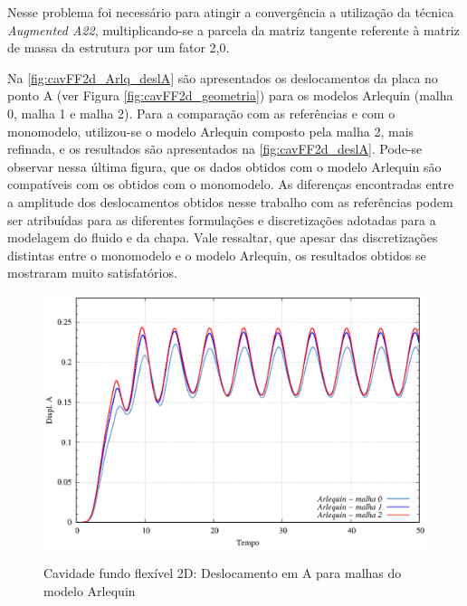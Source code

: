 Nesse problema foi necessário para atingir a convergência a utilização da técnica \textit{Augmented A22}, multiplicando-se a parcela da matriz tangente referente à matriz de massa da estrutura por um fator 2,0.

Na \autoref{fig:cavFF2d_Arlq_deslA} são apresentados os deslocamentos da placa no ponto A (ver Figura \ref{fig:cavFF2d_geometria}) para os modelos Arlequin (malha 0, malha 1 e malha 2). Para a comparação com as referências e com o monomodelo, utilizou-se o modelo Arlequin composto pela malha 2, mais refinada, e os resultados são apresentados na \autoref{fig:cavFF2d_deslA}. Pode-se observar nessa última figura, que os dados obtidos com o modelo Arlequin são compatíveis com os obtidos com o monomodelo. As diferenças encontradas entre a amplitude dos deslocamentos obtidos nesse trabalho com as referências podem ser atribuídas para as diferentes formulações e discretizações adotadas para a modelagem do fluido e da chapa. Vale ressaltar, que apesar das discretizações distintas entre o monomodelo e o modelo Arlequin, os resultados obtidos se mostraram muito satisfatórios.

\begin{figure}[!htbp]
	\caption{Cavidade fundo flexível 2D: Deslocamento em A para malhas do modelo Arlequin}
	\centering 
	\includegraphics[scale=1.0,trim=0cm 0cm 0cm 0cm, clip=true]{Imagens/Cap7/cavFF2d_Arlq_deslA.eps}	
	\label{fig:cavFF2d_Arlq_deslA}
\end{figure}

